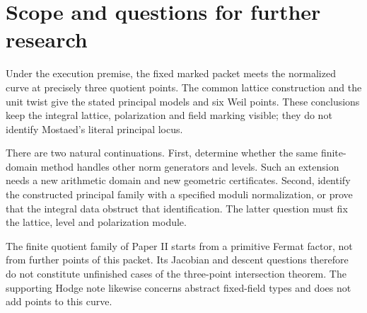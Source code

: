 \section{Scope and questions for further research}\label{sec:conclusion}
Under the execution premise, the fixed marked packet meets the normalized
curve at precisely three quotient points. The common lattice construction
and the unit twist give the stated principal models and six Weil points.
These conclusions keep the integral lattice, polarization and field marking
visible; they do not identify Mostaed's literal principal locus.

There are two natural continuations. First, determine whether the same
finite-domain method handles other norm generators and levels. Such an
extension needs a new arithmetic domain and new geometric certificates.
Second, identify the constructed principal family with a specified moduli
normalization, or prove that the integral data obstruct that identification.
The latter question must fix the lattice, level and polarization module.

The finite quotient family of Paper II starts from a primitive Fermat
factor, not from further points of this packet. Its Jacobian and descent
questions therefore do not constitute unfinished cases of the three-point
intersection theorem. The supporting Hodge note likewise concerns abstract
fixed-field types and does not add points to this curve.
